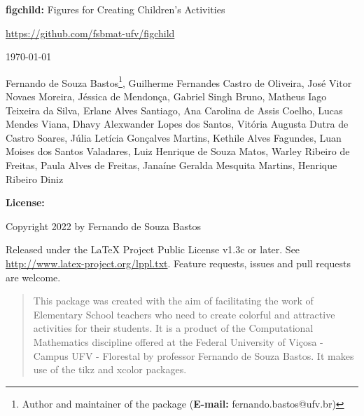 \documentclass[x11names]{article}
\begin{document}


\thispagestyle{empty}

\begin{center}

\textbf{figchild:} Figures for Creating Children's Activities

\vspace{0.5cm}

\url{https://github.com/fsbmat-ufv/figchild}

\vspace{0.5cm}


\vspace{0.5cm}

\today

\end{center}

\vspace{2cm}



 Fernando de Souza Bastos\footnote{Author and maintainer of the package (\textbf{E-mail:} fernando.bastos@ufv.br)}, 
 Guilherme Fernandes Castro de Oliveira, 
 José Vitor Novaes Moreira,
 Jéssica de Mendonça,
 Gabriel Singh Bruno,
 Matheus Iago Teixeira da Silva,
 Erlane Alves Santiago,
 Ana Carolina de Assis Coelho,
 Lucas Mendes Viana,
 Dhavy Alexwander Lopes dos Santos,
 Vitória Augusta Dutra de Castro Soares,
 Júlia Letícia Gonçalves Martins,
 Kethile Alves Fagundes,
 Luan Moises dos Santos Valadares,
 Luiz Henrique de Souza Matos,
 Warley Ribeiro de Freitas,
 Paula Alves de Freitas,
 Janaíne Geralda Mesquita Martins,
 Henrique Ribeiro Diniz
 
\vspace{3cm}

\noindent \textbf{License:}

\vspace{1cm}

\noindent Copyright 2022 by Fernando de Souza Bastos

\vspace{1cm}

\noindent Released under the LaTeX Project Public License v1.3c or later. See \url{http://www.latex-project.org/lppl.txt}. Feature requests, issues and pull requests are welcome.

\newpage

\begin{abstract}
This package was created with the aim of facilitating the work of Elementary School teachers who need to create colorful and attractive activities for their students. It is a product of the Computational Mathematics discipline offered at the Federal University of Viçosa - Campus UFV - Florestal by professor Fernando de Souza Bastos. It makes use of the tikz and xcolor packages.
\end{abstract}
\end{document}
